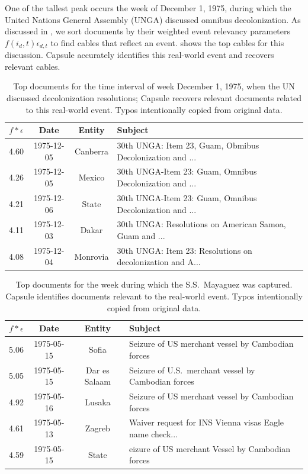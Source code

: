 One of the tallest peak occurs the week of December 1, 1975, during which the United Nations General Assembly (UNGA) discussed omnibus decolonization.
As discussed in , we sort documents by their weighted event relevancy parameters $f(i_d,t) \epsilon_{d,t}$ to find cables that reflect an event.   shows the top cables for this discussion.  Capsule accurately identifies this real-world event and recovers relevant cables.
\begin{table}[tb]
\small
\centering
\begin{tabular}{cccl}
\toprule
$f *\epsilon$ & \textbf{Date} & \textbf{Entity} & \textbf{Subject} \\
\midrule
4.60 & 1975-12-05 & Canberra & 30th UNGA: Item 23, Guam, Obmibus Decolonization and ... \\
4.26 & 1975-12-05 & Mexico & 30th UNGA-Item 23: Guam, Omnibus Decolonization and ... \\
4.21 & 1975-12-06 & State & 30th UNGA-Item 23: Guam, Omnibus Decolonization and ... \\
4.11 & 1975-12-03 & Dakar & 30th UNGA: Resolutions on American Samoa, Guam and ...\\
4.08 & 1975-12-04 & Monrovia & 30th UNGA: Item 23: Resolutions on decolonization and A...\\
\bottomrule
\end{tabular}
\caption{Top documents for the time interval of week December 1, 1975, when the UN discussed decolonization resolutions; Capsule recovers relevant documents related to this real-world event.  Typos intentionally copied from original data.  }

\label{tab:decol}
\end{table}

\begin{table}[tb]
\small
\centering
\begin{tabular}{cccl}
\toprule
$f *\epsilon$ & \textbf{Date} & \textbf{Entity} & \textbf{Subject} \\
\midrule
5.06 & 1975-05-15 & Sofia & Seizure of US merchant vessel by Cambodian forces \\
5.05 & 1975-05-15 & Dar es Salaam & Seizure of U.S.~merchant vessel by Cambodian forces \\
4.92 & 1975-05-16 & Lusaka & Seizure of US merchant vessel by Cambodian forces \\
4.61 & 1975-05-13 & Zagreb & Waiver request for INS Vienna visas Eagle name check... \\
4.59 & 1975-05-15 & State & eizure of US merchant Vessel by Cambodian forces \\
\bottomrule
\end{tabular}
\caption{Top documents for the week during which the S.S.~Mayaguez was captured.  Capsule identifies documents relevant to the real-world event.  Typos intentionally copied from original data.  }

\label{tab:mayaguez}
\end{table}


